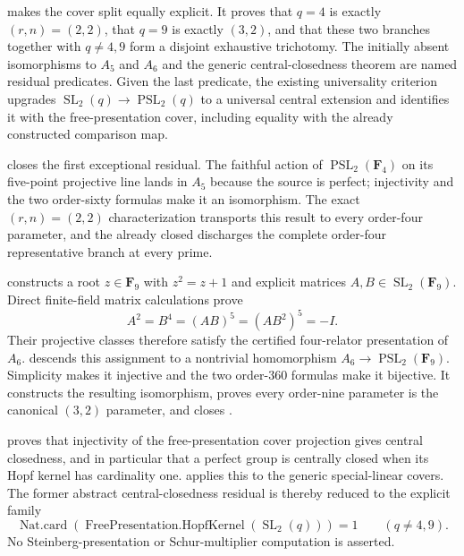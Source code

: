 \documentclass[11pt]{article}
\begin{document}
 makes the
cover split equally explicit.  It proves that \(q=4\) is exactly
\((r,n)=(2,2)\), that \(q=9\) is exactly \((3,2)\), and that these two
branches together with \(q\ne4,9\) form a disjoint exhaustive trichotomy.
The initially absent isomorphisms to \(A_5\) and \(A_6\) and the generic
central-closedness theorem are named residual predicates.  Given the last
predicate, the existing universality criterion upgrades
\(\operatorname{SL}_2(q)\to\operatorname{PSL}_2(q)\) to a universal
central extension and identifies it with the free-presentation cover,
including equality with the already constructed comparison map.

 closes the
first exceptional residual.  The faithful action of
\(\operatorname{PSL}_2(\mathbf F_4)\) on its five-point projective line
lands in \(A_5\) because the source is perfect; injectivity and the two
order-sixty formulas make it an isomorphism.  The exact
\((r,n)=(2,2)\) characterization transports this result to every
order-four parameter, and the already closed
 discharges the complete
order-four representative branch at every prime.

 constructs
a root \(z\in\mathbf F_9\) with \(z^2=z+1\) and explicit matrices
\(A,B\in\operatorname{SL}_2(\mathbf F_9)\).  Direct finite-field matrix
calculations prove
\[
  A^2=B^4=(AB)^5=(AB^2)^5=-I.
\]
Their projective classes therefore satisfy the certified four-relator
presentation of \(A_6\).
 descends
this assignment to a nontrivial homomorphism
\(A_6\to\operatorname{PSL}_2(\mathbf F_9)\).  Simplicity makes it
injective and the two order-\(360\) formulas make it bijective.  It
constructs the resulting isomorphism, proves every order-nine parameter is
the canonical \((3,2)\) parameter, and closes
.

 proves that injectivity of the
free-presentation cover projection gives central closedness, and in
particular that a perfect group is centrally closed when its Hopf kernel
has cardinality one.
 applies
this to the generic special-linear covers.  The former abstract
central-closedness residual is thereby reduced to the explicit family
\[
  \operatorname{Nat.card}\!
    \left(\operatorname{FreePresentation.HopfKernel}
      (\operatorname{SL}_2(q))\right)=1
  \qquad(q\ne4,9).
\]
No Steinberg-presentation or Schur-multiplier computation is asserted.
\end{document}
